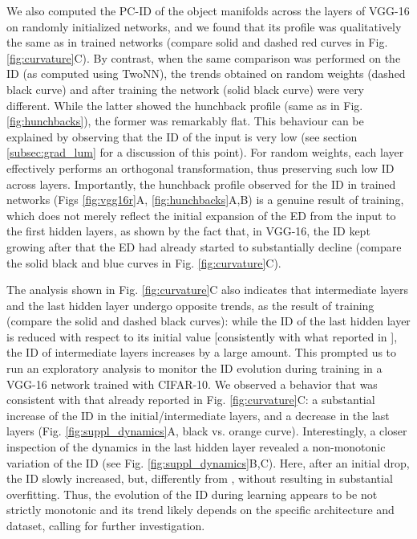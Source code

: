 \documentclass{article}
\begin{document}
We also computed the PC-ID of the object manifolds across the layers of VGG-16 on randomly initialized networks, and we found that its profile was qualitatively the same as in trained networks (compare solid and dashed red curves in Fig. \ref{fig:curvature}C). By contrast, when the same comparison was performed on the ID (as computed using TwoNN), the trends obtained on random weights  (dashed black curve) and after training the network (solid black curve) were very different. While the latter showed the hunchback profile (same as in Fig. \ref{fig:hunchbacks}), the former was remarkably flat.
This behaviour can be explained by observing that the ID of the input is very low (see section \ref{subsec:grad_lum} for a discussion of this point). For random weights, each layer effectively performs an orthogonal transformation, thus preserving such low ID across layers. Importantly, the hunchback profile observed for the ID in trained networks (Figs \ref{fig:vgg16r}A, \ref{fig:hunchbacks}A,B) is a genuine result of training, which does not merely reflect the initial expansion of the ED from the input to the first hidden layers, as shown by the fact that, in VGG-16, the ID kept growing after that the ED had already started to substantially decline (compare the solid black and blue curves in Fig. \ref{fig:curvature}C).

The analysis shown in Fig. \ref{fig:curvature}C also indicates that intermediate layers and the last hidden layer undergo opposite trends, as the result of training (compare the solid and dashed black curves): while the ID of the last hidden layer is reduced with respect to its initial value [consistently with what reported in \cite{Ma_2018}], the ID of intermediate layers increases by a large amount. This prompted us to run an exploratory analysis to monitor the ID evolution during training in a VGG-16 network trained with CIFAR-10. We observed a behavior that was consistent with that already reported in Fig. \ref{fig:curvature}C: a substantial increase of the ID in the initial/intermediate layers, and a decrease in the last layers (Fig. \ref{fig:suppl_dynamics}A, black vs. orange curve). Interestingly, a closer inspection of the dynamics in the last hidden layer revealed a non-monotonic variation of the ID (see Fig. \ref{fig:suppl_dynamics}B,C). Here, after an initial drop, the ID slowly increased, but, differently from \cite{Ma_2018}, without resulting in substantial overfitting. Thus, the evolution of the ID during learning appears to be not strictly monotonic and its trend likely depends on the specific architecture and dataset, calling for further investigation.
\end{document}
